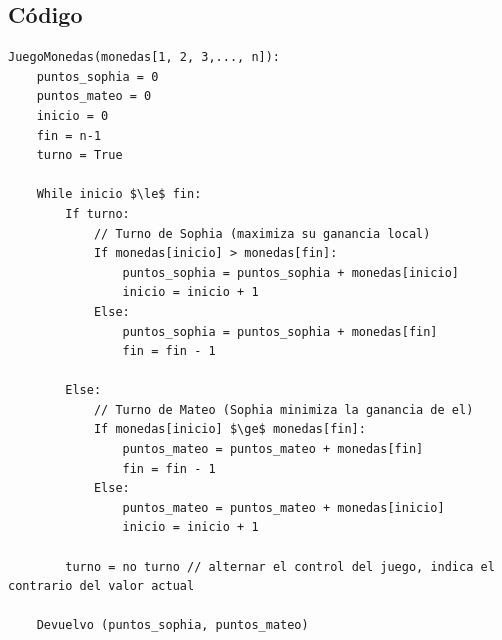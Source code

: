 \subsection{Código}\label{rec:codigo} %

\begin{lstlisting}[mathescape=true]
JuegoMonedas(monedas[1, 2, 3,..., n]):
    puntos_sophia = 0
    puntos_mateo = 0
    inicio = 0
    fin = n-1
    turno = True
    
    While inicio $\le$ fin:
        If turno:
            // Turno de Sophia (maximiza su ganancia local)
            If monedas[inicio] > monedas[fin]:
                puntos_sophia = puntos_sophia + monedas[inicio]
                inicio = inicio + 1
            Else:
                puntos_sophia = puntos_sophia + monedas[fin]
                fin = fin - 1
    
        Else:
            // Turno de Mateo (Sophia minimiza la ganancia de el)
            If monedas[inicio] $\ge$ monedas[fin]:
                puntos_mateo = puntos_mateo + monedas[fin]
                fin = fin - 1
            Else:
                puntos_mateo = puntos_mateo + monedas[inicio]
                inicio = inicio + 1
        
        turno = no turno // alternar el control del juego, indica el contrario del valor actual
    
    Devuelvo (puntos_sophia, puntos_mateo)

\end{lstlisting}
